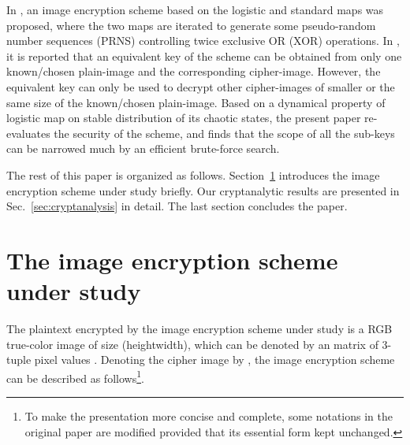 \documentclass[twocolumn]{svjour3}
\begin{document}
In \cite{Pareek:CNSNS2009}, an image encryption scheme based on the logistic and standard maps was proposed, where the two maps
are iterated to generate some pseudo-random number sequences (PRNS) controlling twice exclusive OR (XOR) operations. In \cite{Rhouma:BreakPareek:CNSNS10},
it is reported that an equivalent key of the scheme can be obtained from only one known/chosen plain-image and the corresponding cipher-image. However,
the equivalent key can only be used to decrypt other cipher-images of smaller or the same size of the known/chosen plain-image. Based on a dynamical property of logistic map on stable distribution of its chaotic states, the present paper re-evaluates the security of the
scheme, and finds that the scope of all the sub-keys can be narrowed much by an efficient brute-force search.

The rest of this paper is organized as follows. Section~\ref{sec:encryptscheme} introduces the image encryption
scheme under study briefly. Our cryptanalytic results are presented
in Sec.~\ref{sec:cryptanalysis} in detail. The last section
concludes the paper.

\section{The image encryption scheme under study}
\label{sec:encryptscheme}

The plaintext encrypted by the image encryption scheme under study
is a RGB true-color image of size  (heightwidth),
which can be denoted by an  matrix of 3-tuple pixel
values  . Denoting the cipher image by  , the
image encryption scheme can be described as follows\footnote{To make
the presentation more concise and complete, some notations in the
original paper are modified provided that its essential form kept unchanged.}.
\end{document}
